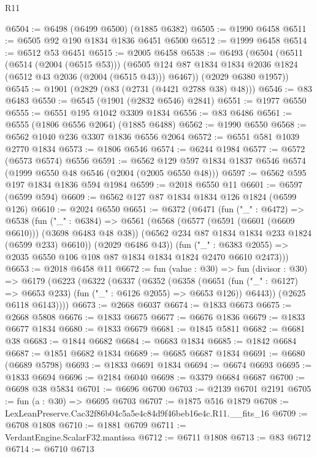 \begin{lexlean}{R11}
\begin{coremodule}
@6504 := @6498 (@6499 @6500) (@1885 @6382)
@6505 := @1990 @6458
@6511 := @6505 @92 @190 @1834 @1836 @6451 @6500
@6512 := @1999 @6458
@6514 := @6512 @53 @6451
@6515 := @2005 @6458
@6538 := @6493
    (@6504
      (@6511
        (@6514 (@2004 (@6515 @53)))
        (@6505 @124 @87 @1834 @1834 @2036 @1824 (@6512 @43 @2036 (@2004 (@6515 @43))) @6467))
      (@2029 @6380 @1957))
@6545 := @1901 (@2829 (@83 (@2731 (@4421 @2788 @38) @48)))
@6546 := @83 @6483
@6550 := @6545 (@1901 (@2832 @6546) @2841)
@6551 := @1977 @6550
@6555 := @6551 @195 @1042 @3309 @1834
@6556 := @83 @6486
@6561 := @6555 (@1806 @6556 @2064) (@1885 @6488)
@6562 := @1990 @6550
@6568 := @6562 @1040 @236 @3307 @1836 @6556 @2064
@6572 := @6551 @581 @1039 @2770 @1834
@6573 := @1806 @6546
@6574 := @6244 @1984
@6577 := @6572 (@6573 @6574) @6556
@6591 := @6562 @129 @597 @1834 @1837 @6546 @6574 (@1999 @6550 @48 @6546 (@2004 (@2005 @6550 @48)))
@6597 := @6562 @595 @197 @1834 @1836 @594 @1984
@6599 := @2018 @6550 @11
@6601 := @6597 (@6599 @594)
@6609 := @6562 @127 @87 @1834 @1834 @126 @1824 (@6599 @126)
@6610 := @2024 @6550
@6651 := @6372
    (@6471
      (fun ("_" : @6472) =>
      @6538
        (fun ("_" : @6384) =>
        @6561
          (@6568
            (@6577 (@6591 (@6601 (@6609 @6610))) (@3698 @6483 @48 @38))
            (@6562 @234 @87 @1834 @1834 @233 @1824 (@6599 @233) @6610))
          (@2029 @6486 @43))
        (fun ("_" : @6383 @2055) => @2035 @6550 @106 @108 @87 @1834 @1834 @1824 @2470 @6610 @2473)))
@6653 := @2018 @6458 @11
@6672 := fun (value : @30) =>
  fun (divisor : @30) =>
  @6179
    (@6223
      (@6322
        (@6337
          (@6352
            (@6358
              (@6651 (fun ("_" : @6127) => @6653 @233) (fun ("_" : @6126 @2055) => @6653 @126))
              @6443))
          (@2625 @6118 @6143))))
@6673 := @2668 @6037
@6674 := @1833 @6673
@6675 := @2668 @5808
@6676 := @1833 @6675
@6677 := @6676 @1836
@6679 := @1833 @6677 @1834
@6680 := @1833 @6679
@6681 := @1845 @5811
@6682 := @6681 @38
@6683 := @1844 @6682
@6684 := @6683 @1834
@6685 := @1842 @6684
@6687 := @1851 @6682 @1834
@6689 := @6685 @6687 @1834
@6691 := @6680 (@6689 @5798)
@6693 := @1833 @6691 @1834
@6694 := @6674 @6693
@6695 := @1833 @6694
@6696 := @2184 @6040
@6698 := @3379 @6684 @6687
@6700 := @6698 @38 @5834
@6701 := @6696 @6700
@6703 := @2139 @6701 @2191
@6705 := fun (a : @30) => @6695 @6703
@6707 := @1875 @516 @1879
@6708 := LexLeanPreserve.Cac32f86b04c5a5e4c84d9f46beb16e4c.R11.__fits_16
@6709 := @6708 @1808
@6710 := @1881 @6709
@6711 := VerdantEngine.ScalarF32.mantissa
@6712 := @6711 @1808
@6713 := @83 @6712
@6714 := @6710 @6713

\end{coremodule}
\end{lexlean}
